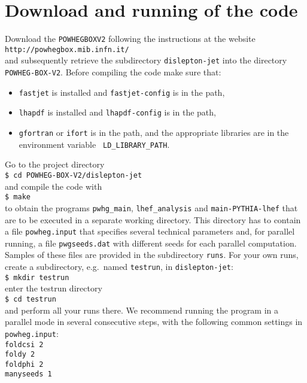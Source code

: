 \documentclass[a4paper,11pt]{article}
\newcommand\POWHEGBOXvTWO{{\tt POWHEG\;BOX\;V2}}
\begin{document}
\section*{Download and running of the code}
%
Download the \POWHEGBOXvTWO{} 
following the instructions at the website 
\\[2ex]
{\tt http://powhegbox.mib.infn.it/}
\\[2ex]
and subsequently retrieve the subdirectory {\tt dislepton-jet}
into the directory {\tt POWHEG-BOX-V2}.
Before compiling the code make sure that:
%
\begin{itemize}
\item 
{\tt fastjet} is installed and {\tt fastjet-config} is in the path,
\item 
{\tt lhapdf} is installed and {\tt lhapdf-config} is in the path,
\item
{\tt gfortran} or {\tt ifort} is in the path, and the
appropriate libraries are in the environment variable {\tt
  LD\_LIBRARY\_PATH}. 
\end{itemize}
%
Go to the project directory
\\[2ex]
{\tt \$ cd POWHEG-BOX-V2/dislepton-jet}
\\[2ex]
and compile the code with
\\[2ex]
{\tt \$ make}
\\[2ex]
to obtain the programs {\tt pwhg\_main},
{\tt lhef\_analysis} and {\tt main-PYTHIA-lhef}
that are to be executed in a separate working directory. This directory has to 
contain a file {\tt powheg.input} that specifies several technical parameters
and, for parallel running, a file {\tt pwgseeds.dat}
with different seeds for each parallel computation.
Samples of these files are provided
in the subdirectory {\tt runs}.
For your own runs, create a subdirectory, e.g.\ named {\tt testrun}, in {\tt dislepton-jet}:
\\[2ex]
{\tt \$ mkdir testrun}
\\[2ex]
enter the testrun directory
\\[2ex]
{\tt \$ cd testrun}
\\[2ex]
and perform all your runs there.
We recommend running the program in a parallel mode in several consecutive steps, with the following common settings in {\tt powheg.input}:
\\[2ex]
{\tt foldcsi   2}
\\
{\tt foldy     2}
\\
{\tt foldphi   2}
\\
{\tt manyseeds   1}
\\[2ex]
\end{document}
